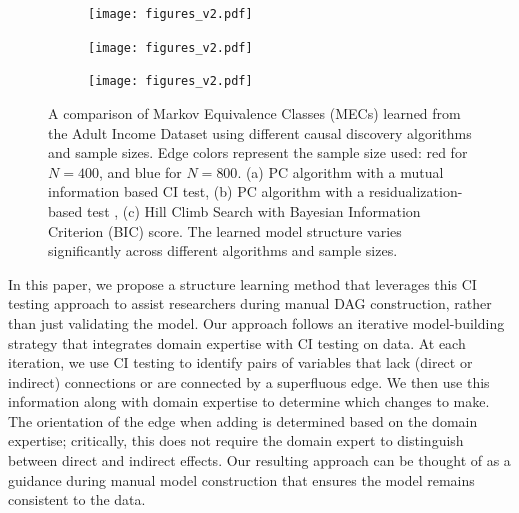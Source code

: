 \documentclass{uai2025} %
\begin{document}

\begin{figure}[t!]
    \begin{subfigure}{0.5 \textwidth}
	\centering
    	\texttt{[image: figures\_v2.pdf]}
    	\caption{}
    \end{subfigure}
    \begin{subfigure}{0.5\textwidth}
	\centering
    	\texttt{[image: figures\_v2.pdf]}
    	\caption{}
    \end{subfigure}
    \begin{subfigure}{0.5\textwidth}
	\centering
    	\texttt{[image: figures\_v2.pdf]}
    	\caption{}
    \end{subfigure}

    \caption{A comparison of Markov Equivalence Classes (MECs) learned from the Adult
	     Income Dataset \citep{Becker1996} using different causal discovery
	     algorithms and sample sizes. Edge colors represent the sample size
	     used: red for $N=400$, and blue for $N=800$. (a) PC algorithm with a
	     mutual information based CI test, (b) PC algorithm with a
    	     residualization-based test \citep{Ankan2023}, (c) Hill Climb Search with
	     Bayesian Information Criterion (BIC) score. The learned model structure varies
             significantly across different algorithms and sample sizes.}
    \label{fig:intro}
\end{figure}

In this paper, we propose a structure learning method that leverages this CI
testing approach to assist researchers during manual DAG construction, rather
than just validating the model. Our approach follows an iterative
model-building strategy that integrates domain expertise with CI testing on
data. At each iteration, we use CI testing to identify pairs of variables that
lack (direct or indirect) connections or are connected by a superfluous edge.
 We then use this information
along with domain expertise to determine which changes to make.
The orientation of the edge when adding is determined based on the domain
expertise; critically, this does not require the domain expert to distinguish 
between direct and indirect effects. Our resulting approach can be 
thought of as a guidance during manual model construction that ensures the 
model remains consistent to the data.
\end{document}
